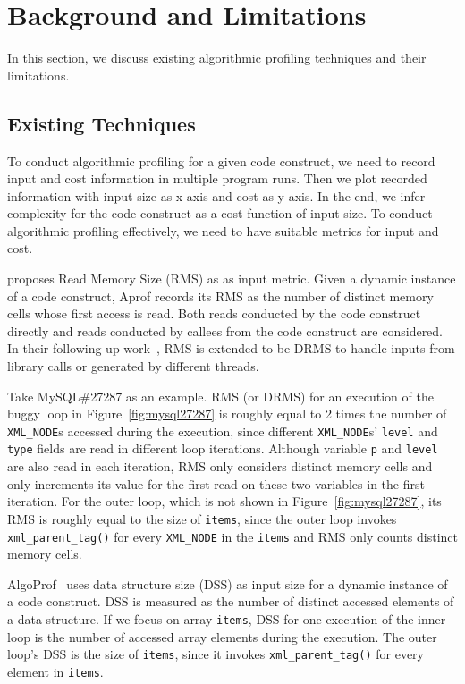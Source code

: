 
\section{Background and Limitations}
\label{sec:back}

In this section, we discuss existing algorithmic profiling techniques 
and their limitations. 


\subsection{Existing Techniques}
To conduct algorithmic profiling for a given code construct,
we need to record input and cost information in multiple program runs. 
Then we plot recorded information with input size as x-axis and cost as y-axis.
In the end, we infer complexity for the code construct as a cost function of input size. 
To conduct algorithmic profiling effectively, 
we need to have suitable metrics for input and cost. 

\citet{Aprof1} proposes Read Memory Size (RMS) as as input metric. 
Given a dynamic instance of a code construct,
Aprof records its RMS as the number of distinct memory cells 
whose first access is read. 
Both reads conducted by the code construct directly and 
reads conducted by callees from the code construct are considered. 
In their following-up work~\cite{Aprof2}, 
RMS is extended to be DRMS to handle inputs from library calls 
or generated by different threads. 

Take MySQL\#27287 as an example.
RMS (or DRMS) for an execution of
the buggy loop in Figure~\ref{fig:mysql27287}
is roughly equal to 2 times the number of \texttt{XML\_NODE}s 
accessed during the execution, 
since different \texttt{XML\_NODE}s' \texttt{level} and \texttt{type} 
fields are read in different loop iterations. 
Although variable \texttt{p} and \texttt{level} are also read in each iteration,
RMS only considers distinct memory cells and 
only increments its value for the first read on these 
two variables in the first iteration. 
For the outer loop, which is not shown in Figure~\ref{fig:mysql27287}, 
its RMS is roughly equal to the size of \texttt{items}, 
since the outer loop invokes \texttt{xml\_parent\_tag()} for every
\texttt{XML\_NODE} in the \texttt{items} and RMS only 
counts distinct memory cells. 

AlgoProf~\citep{AlgoProf} uses data structure size (DSS) 
as input size for a dynamic instance of a code construct.
DSS is measured as the number of distinct accessed elements of a data structure.  
If we focus on array \texttt{items},
DSS for one execution of the inner loop is the number of accessed array elements during 
the execution. 
The outer loop's DSS is the size of \texttt{items}, 
since it invokes \texttt{xml\_parent\_tag()} for every element in \texttt{items}.

